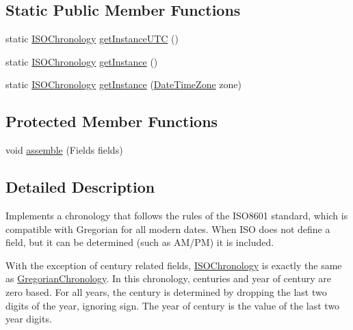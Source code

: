 \subsection*{Static Public Member Functions}
\begin{DoxyCompactItemize}
\item 
static \hyperlink{classorg_1_1joda_1_1time_1_1chrono_1_1_i_s_o_chronology}{I\-S\-O\-Chronology} \hyperlink{classorg_1_1joda_1_1time_1_1chrono_1_1_i_s_o_chronology_ac6bdb950dd4cf56fa75a6bc0dddba7ae}{get\-Instance\-U\-T\-C} ()
\item 
static \hyperlink{classorg_1_1joda_1_1time_1_1chrono_1_1_i_s_o_chronology}{I\-S\-O\-Chronology} \hyperlink{classorg_1_1joda_1_1time_1_1chrono_1_1_i_s_o_chronology_aacb8a1ac8665b9e15c722c1eb7206f70}{get\-Instance} ()
\item 
static \hyperlink{classorg_1_1joda_1_1time_1_1chrono_1_1_i_s_o_chronology}{I\-S\-O\-Chronology} \hyperlink{classorg_1_1joda_1_1time_1_1chrono_1_1_i_s_o_chronology_a0e7c7bb320f2f9c95a02d1363ef5b4bb}{get\-Instance} (\hyperlink{classorg_1_1joda_1_1time_1_1_date_time_zone}{Date\-Time\-Zone} zone)
\end{DoxyCompactItemize}
\subsection*{Protected Member Functions}
\begin{DoxyCompactItemize}
\item 
void \hyperlink{classorg_1_1joda_1_1time_1_1chrono_1_1_i_s_o_chronology_abf12d68d93bfad680a3e5bb76e43e046}{assemble} (Fields fields)
\end{DoxyCompactItemize}


\subsection{Detailed Description}
Implements a chronology that follows the rules of the I\-S\-O8601 standard, which is compatible with Gregorian for all modern dates. When I\-S\-O does not define a field, but it can be determined (such as A\-M/\-P\-M) it is included. 

With the exception of century related fields, \hyperlink{classorg_1_1joda_1_1time_1_1chrono_1_1_i_s_o_chronology}{I\-S\-O\-Chronology} is exactly the same as \hyperlink{classorg_1_1joda_1_1time_1_1chrono_1_1_gregorian_chronology}{Gregorian\-Chronology}. In this chronology, centuries and year of century are zero based. For all years, the century is determined by dropping the last two digits of the year, ignoring sign. The year of century is the value of the last two year digits. 


